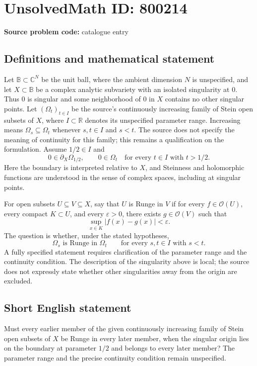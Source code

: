 \documentclass[11pt]{article}
\newcommand{\R}{\mathbb{R}}
\newcommand{\C}{\mathbb{C}}
\begin{document}
\section*{UnsolvedMath ID: 800214}
\textbf{Source problem code:} catalogue entry
\subsection{Definitions and mathematical statement}
Let \(\mathbb B\subset\C^N\) be the unit ball, where the ambient dimension \(N\) is unspecified, and let \(X\subset\mathbb B\) be a complex analytic subvariety with an isolated singularity at \(0\). Thus \(0\) is singular and some neighborhood of \(0\) in \(X\) contains no other singular points. Let \((\Omega_t)_{t\in I}\) be the source's continuously increasing family of Stein open subsets of \(X\), where \(I\subset\R\) denotes its unspecified parameter range. Increasing means \(\Omega_s\subseteq\Omega_t\) whenever \(s,t\in I\) and \(s<t\). The source does not specify the meaning of continuity for this family; this remains a qualification on the formulation. Assume \(1/2\in I\) and
\[
0\in\partial_X\Omega_{1/2},\qquad
0\in\Omega_t\quad\text{for every }t\in I\text{ with }t>1/2.
\]
Here the boundary is interpreted relative to \(X\), and Steinness and holomorphic functions are understood in the sense of complex spaces, including at singular points.

For open subsets \(U\subseteq V\subseteq X\), say that \(U\) is Runge in \(V\) if for every \(f\in\mathcal O(U)\), every compact \(K\subset U\), and every \(\varepsilon>0\), there exists \(g\in\mathcal O(V)\) such that
\[
\sup_{x\in K}|f(x)-g(x)|<\varepsilon.
\]
The question is whether, under the stated hypotheses,
\[
\Omega_s\text{ is Runge in }\Omega_t
\qquad\text{for every }s,t\in I\text{ with }s<t.
\]
A fully specified statement requires clarification of the parameter range and the continuity condition. The description of the singularity above is local; the source does not expressly state whether other singularities away from the origin are excluded.
\subsection{Short English statement}
Must every earlier member of the given continuously increasing family of Stein open subsets of \(X\) be Runge in every later member, when the singular origin lies on the boundary at parameter \(1/2\) and belongs to every later member? The parameter range and the precise continuity condition remain unspecified.
\end{document}

